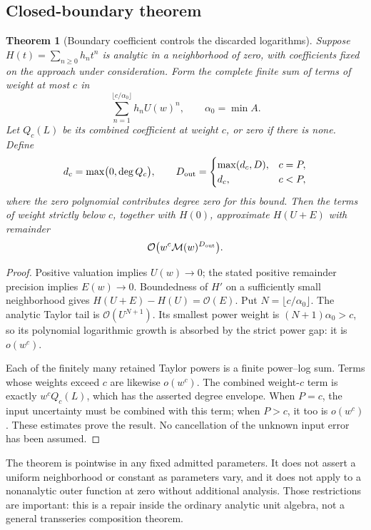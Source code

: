 \documentclass[11pt,a4paper]{article}
\newcommand{\OO}{\mathcal O}
\newcommand{\M}{\mathcal M}
\newtheorem{theorem}[proposition]{Theorem}
\begin{document}
\subsection{Closed-boundary theorem}
\begin{theorem}[Boundary coefficient controls the discarded logarithms]
Suppose \(H(t)=\sum_{n\ge0}h_nt^n\) is analytic in a neighborhood of zero, with coefficients fixed on the approach under consideration. Form the complete finite sum of terms of weight at most \(c\) in
\[
 \sum_{n=1}^{\lfloor c/\alpha_0\rfloor}h_n U(w)^n,
 \qquad \alpha_0=\min A.
\]
Let \(Q_c(L)\) be its combined coefficient at weight \(c\), or zero if there is none. Define
\[
 d_c=\max\bigl(0,\deg Q_c\bigr),
 \qquad
 D_{\rm out}=\begin{cases}
  \max(d_c,D),&c=P,\\
  d_c,&c<P,
 \end{cases}
\]
where the zero polynomial contributes degree zero for this bound. Then the terms of weight strictly below \(c\), together with \(H(0)\), approximate \(H(U+E)\) with remainder
\[
 \OO\bigl(w^c\M(w)^{D_{\rm out}}\bigr).
\]
\end{theorem}
\begin{proof}
Positive valuation implies \(U(w)\to0\); the stated positive remainder precision implies \(E(w)\to0\). Boundedness of \(H'\) on a sufficiently small neighborhood gives
\(H(U+E)-H(U)=\OO(E)\).
Put \(N=\lfloor c/\alpha_0\rfloor\). The analytic Taylor tail is \(\OO(U^{N+1})\). Its smallest power weight is \((N+1)\alpha_0>c\), so its polynomial logarithmic growth is absorbed by the strict power gap: it is \(o(w^c)\).

Each of the finitely many retained Taylor powers is a finite power--log sum. Terms whose weights exceed \(c\) are likewise \(o(w^c)\). The combined weight-\(c\) term is exactly \(w^cQ_c(L)\), which has the asserted degree envelope. When \(P=c\), the input uncertainty must be combined with this term; when \(P>c\), it too is \(o(w^c)\). These estimates prove the result. No cancellation of the unknown input error has been assumed.
\end{proof}

The theorem is pointwise in any fixed admitted parameters. It does not assert a uniform neighborhood or constant as parameters vary, and it does not apply to a nonanalytic outer function at zero without additional analysis. Those restrictions are important: this is a repair inside the ordinary analytic unit algebra, not a general transseries composition theorem.
\end{document}
